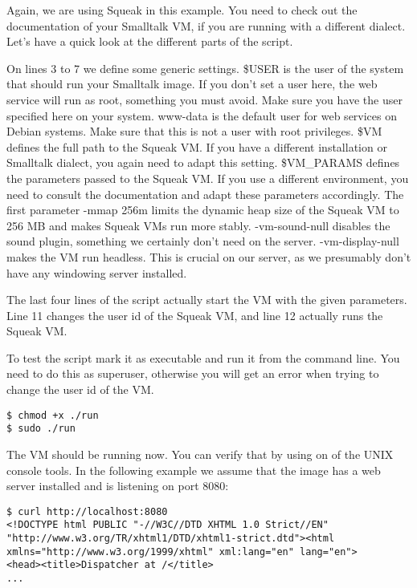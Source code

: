 \documentclass[a4paper,10pt,twoside]{book}
\newcommand{\ct}[1]{{\small\ttfamily\textup{#1}}}
\begin{document}
Again, we are using Squeak in this example. You need to check out the documentation of your Smalltalk VM, if you are running with a different dialect. Let's have a quick look at the different parts of the script. 

On lines 3 to 7 we define some generic settings. \ct{\$USER} is the user of the system that should run your Smalltalk image. If you don't set a user here, the web service will run as root, something you must avoid. Make sure you have the user specified here on your system. \ct{www-data} is the default user for web services on Debian systems. Make sure that this is not a user with root privileges. \ct{\$VM} defines the full path to the Squeak VM. If you have a different installation or Smalltalk dialect, you again need to adapt this setting. \ct{\$VM\_PARAMS} defines the parameters passed to the Squeak VM. If you use a different environment, you need to consult the documentation and adapt these parameters accordingly. The first parameter \ct{-mmap 256m} limits the dynamic heap size of the Squeak VM to 256 MB and makes Squeak VMs run more stably. \ct{-vm-sound-null} disables the sound plugin, something we certainly don't need on the server. \ct{-vm-display-null} makes the VM run headless. This is crucial on our server, as we presumably don't have any windowing server installed.

The last four lines of the script actually start the VM with the given parameters. Line 11 changes the user id of the Squeak VM, and line 12 actually runs the Squeak VM.

To test the script mark it as executable and run it from the command line. You need to do this as superuser, otherwise you will get an error when trying to change the user id of the VM.

\begin{lstlisting}
$ chmod +x ./run
$ sudo ./run
\end{lstlisting}

The VM should be running now. You can verify that by using on of the UNIX console tools. In the following example we assume that the image has a web server installed and is listening on port 8080:

\begin{lstlisting}
$ curl http://localhost:8080
<!DOCTYPE html PUBLIC "-//W3C//DTD XHTML 1.0 Strict//EN"
"http://www.w3.org/TR/xhtml1/DTD/xhtml1-strict.dtd"><html
xmlns="http://www.w3.org/1999/xhtml" xml:lang="en" lang="en">
<head><title>Dispatcher at /</title>
...
\end{lstlisting}
\end{document}
